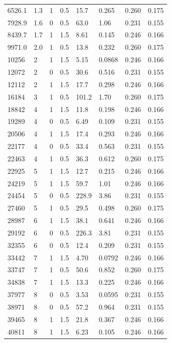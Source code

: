 \documentclass[preview]{standalone}
\begin{document}
{{\begin{tabular}{L{1.2cm}C{1.2cm} C{0.3cm}C{0.5cm} C{1.4cm}C{1.4cm} C{1.4cm}C{1.4cm}}
  6526.1  &   1.3  & 1     & 0.5 &  15.7  & 0.265  & 0.260 &  0.175   \\ 
  7928.9  &   1.6  & 0     & 0.5 &  63.0  & 1.06  & 0.231 &  0.155   \\ 
  8439.7  &   1.7  & 1     & 1.5 &  8.61  & 0.145  & 0.246 &  0.166   \\ 
  9971.0  &   2.0  & 1     & 0.5 &  13.8  & 0.232  & 0.260 &  0.175   \\ 
  10256  &     2  & 1     & 1.5 &  5.15  & 0.0868  & 0.246 &  0.166   \\ 
  12072  &     2  & 0     & 0.5 &  30.6  & 0.516  & 0.231 &  0.155   \\ 
  12112  &     2  & 1     & 1.5 &  17.7  & 0.298  & 0.246 &  0.166   \\ 
  16184  &     3  & 1     & 0.5 &  101.2  & 1.70  & 0.260 &  0.175   \\ 
  18842  &     4  & 1     & 1.5 &  11.8  & 0.198  & 0.246 &  0.166   \\ 
  19289  &     4  & 0     & 0.5 &  6.49  & 0.109  & 0.231 &  0.155   \\ 
  20506  &     4  & 1     & 1.5 &  17.4  & 0.293  & 0.246 &  0.166   \\ 
  22177  &     4  & 0     & 0.5 &  33.4  & 0.563  & 0.231 &  0.155   \\ 
  22463  &     4  & 1     & 0.5 &  36.3  & 0.612  & 0.260 &  0.175   \\ 
  22925  &     5  & 1     & 1.5 &  12.7  & 0.215  & 0.246 &  0.166   \\ 
  24219  &     5  & 1     & 1.5 &  59.7  & 1.01  & 0.246 &  0.166   \\ 
  24454  &     5  & 0     & 0.5 &  228.9  & 3.86  & 0.231 &  0.155   \\ 
  27460  &     5  & 1     & 0.5 &  29.5  & 0.498  & 0.260 &  0.175   \\ 
  28987  &     6  & 1     & 1.5 &  38.1  & 0.641  & 0.246 &  0.166   \\ 
  29192  &     6  & 0     & 0.5 &  226.3  & 3.81  & 0.231 &  0.155   \\ 
  32355  &     6  & 0     & 0.5 &  12.4  & 0.209  & 0.231 &  0.155   \\ 
  33442  &     7  & 1     & 1.5 &  4.70  & 0.0792  & 0.246 &  0.166   \\ 
  33747  &     7  & 1     & 0.5 &  50.6  & 0.852  & 0.260 &  0.175   \\ 
  34838  &     7  & 1     & 1.5 &  13.3  & 0.225  & 0.246 &  0.166   \\ 
  37977  &     8  & 0     & 0.5 &  3.53  & 0.0595  & 0.231 &  0.155   \\ 
  38971  &     8  & 0     & 0.5 &  57.2  & 0.964  & 0.231 &  0.155   \\ 
  39465  &     8  & 1     & 1.5 &  21.8  & 0.367  & 0.246 &  0.166   \\ 
  40811  &     8  & 1     & 1.5 &  6.23  & 0.105  & 0.246 &  0.166   \\ 
\hline 
\end{tabular} 

}}
\end{document}
